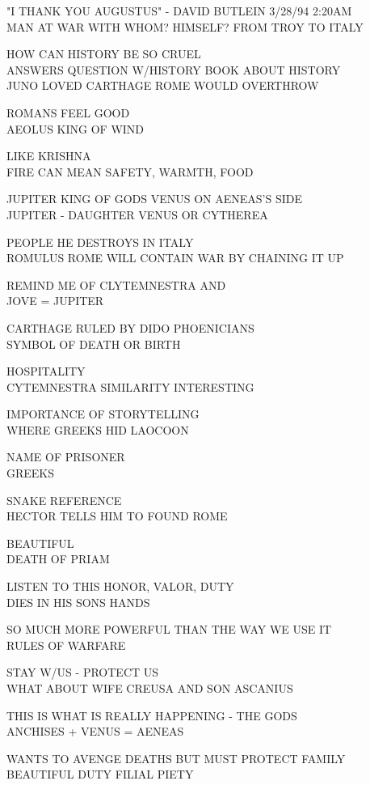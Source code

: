 \documentclass[10pt,letterpaper]{article}
\begin{document}
"I THANK YOU AUGUSTUS" {-} DAVID BUTLEIN 3/28/94 2:20AM\\
MAN AT WAR WITH WHOM? HIMSELF? FROM TROY TO ITALY

HOW CAN HISTORY BE SO CRUEL\\
ANSWERS QUESTION W/HISTORY BOOK ABOUT HISTORY\\
JUNO LOVED CARTHAGE ROME WOULD OVERTHROW

ROMANS FEEL GOOD\\
AEOLUS KING OF WIND

LIKE KRISHNA\\
FIRE CAN MEAN SAFETY, WARMTH, FOOD

JUPITER KING OF GODS VENUS ON AENEAS'S SIDE\\
JUPITER {-} DAUGHTER VENUS OR CYTHEREA

PEOPLE HE DESTROYS IN ITALY\\
ROMULUS ROME WILL CONTAIN WAR BY CHAINING IT UP

REMIND ME OF CLYTEMNESTRA AND\\
JOVE = JUPITER

CARTHAGE RULED BY DIDO PHOENICIANS\\
SYMBOL OF DEATH OR BIRTH

HOSPITALITY\\
CYTEMNESTRA SIMILARITY INTERESTING

IMPORTANCE OF STORYTELLING\\
WHERE GREEKS HID LAOCOON

NAME OF PRISONER\\
GREEKS

SNAKE REFERENCE\\
HECTOR TELLS HIM TO FOUND ROME

BEAUTIFUL\\
DEATH OF PRIAM

LISTEN TO THIS HONOR, VALOR, DUTY\\
DIES IN HIS SONS HANDS

SO MUCH MORE POWERFUL THAN THE WAY WE USE IT\\
RULES OF WARFARE

STAY W/US {-} PROTECT US\\
WHAT ABOUT WIFE CREUSA AND SON ASCANIUS

THIS IS WHAT IS REALLY HAPPENING {-} THE GODS\\
ANCHISES + VENUS = AENEAS

WANTS TO AVENGE DEATHS BUT MUST PROTECT FAMILY\\
BEAUTIFUL DUTY FILIAL PIETY
\end{document}
